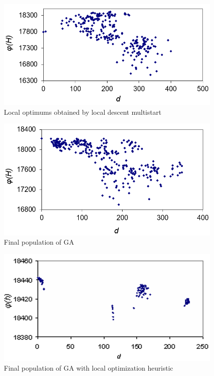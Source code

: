 \documentclass{ifacconf}
\begin{document}
 \begin{figure}[h!]
	\centering
	\includegraphics[scale=0.5]{multistart_klaster}
  \caption{Local optimums obtained by local descent multistart } \label{fig:multistart_klaster}
  \end{figure}
 \begin{figure}[h!]
	\centering
	\includegraphics[scale=0.5]{ga_klaster}
  \caption{Final population of GA} \label{fig:ga_klaster}
  \end{figure}
 \begin{figure}[h!]
	\centering
	\includegraphics[scale=0.5]{gals_klaster}
  \caption{Final population of GA with local optimization heuristic} \label{fig:gals_klaster}
  \end{figure}
\end{document}
